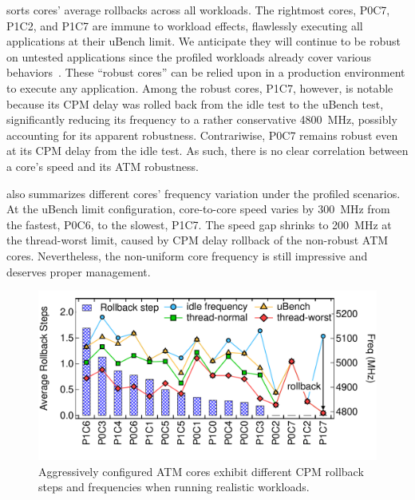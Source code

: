 sorts cores' average rollbacks across all workloads. The rightmost cores, P0C7, P1C2, and P1C7 are immune to workload effects, flawlessly executing all applications at their uBench limit. We anticipate they will continue to be robust on untested applications since the profiled workloads already cover various behaviors~\cite{song2018spec}. These ``robust cores'' can be relied upon in a production environment to execute any application. Among the robust cores, P1C7, however, is notable because its CPM delay was rolled back from the idle test to the uBench test, significantly reducing its frequency to a rather conservative 4800~MHz, possibly accounting for its apparent robustness. Contrariwise, P0C7 remains robust even at its CPM delay from the idle test. As such, there is no clear correlation between a core's speed and its ATM robustness. 


 also summarizes different cores' frequency variation under the profiled scenarios. At the uBench limit configuration, core-to-core speed varies by 300~MHz from the fastest, P0C6, to the slowest, P1C7. The speed gap shrinks to 200~MHz at the thread-worst limit, caused by CPM delay rollback of the non-robust ATM cores. Nevertheless, the non-uniform core frequency is still impressive and deserves proper management.

\begin{figure}[t]
  \centering
  \includegraphics[trim=0 20 0 20,clip,width=\linewidth]{graphs/process//spec-rollback.pdf}
  \caption{Aggressively configured ATM cores exhibit different CPM rollback steps and frequencies when running realistic workloads.}
  \label{fig:core-cpm-var}
\end{figure}

